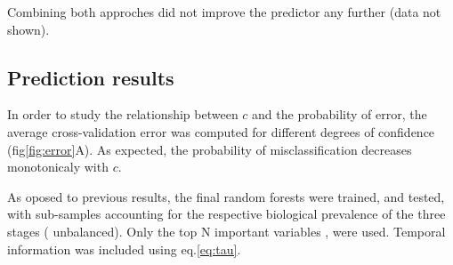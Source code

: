 
Combining both approches did not improve the predictor any further (data not shown).

\subsection{Prediction results}

In order to study the relationship between $c$ and the probability of error,
the average cross-validation error was computed for different degrees of confidence (fig\ref{fig:error}A).
As expected, the probability of misclassification decreases monotonicaly with $c$.

As oposed to previous results, the final random forests were trained, and tested, with sub-samples accounting for the respective biological prevalence of the three stages (\ie{} unbalanced).
Only the top N\TODO{} important variables , were used. Temporal information was included using eq.\ref{eq:tau}.



